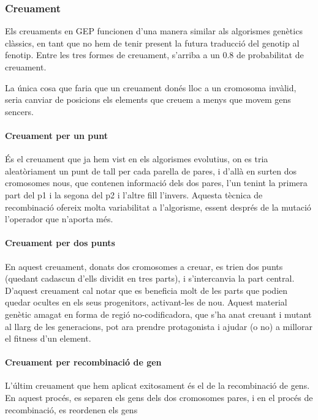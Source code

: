 \subsubsection{Creuament} %
\label{Gssub:Creuament}

Els creuaments en GEP funcionen d'una manera similar als algorismes genètics
clàssics, en tant que no hem de tenir present la futura traducció del genotip al
fenotip.  Entre les tres formes de creuament, s'arriba a un 0.8 de probabilitat
de creuament.

La única cosa que faria que un creuament donés lloc a un cromosoma invàlid,
seria canviar de posicions els elements que creuem a menys que movem gens
sencers.

\paragraph{Creuament per un punt} %
\label{par:Creuament per un punt}
És el creuament que ja hem vist en els algorismes evolutius, on es tria
aleatòriament un punt de tall per cada parella de pares, i d'allà en surten dos
cromosomes nous, que contenen informació dels dos pares, l'un tenint la primera
part del p1 i la segona del p2 i l'altre fill l'invers.  Aquesta tècnica de
recombinació ofereix molta variabilitat a l'algorisme, essent després de la
mutació l'operador que n'aporta més.
\paragraph{Creuament per dos punts} %
\label{par:Creuament per dos punts}
En aquest creuament, donats dos cromosomes a creuar, es trien dos punts (quedant
cadascun d'ells dividit en tres parts), i s'intercanvia la part central.
D'aquest creuament cal notar que es beneficia molt de les parts que podien
quedar ocultes en els seus progenitors, activant-les de nou.  Aquest material
genètic amagat en forma de regió no-codificadora, que s'ha anat creuant i mutant
al llarg de les generacions, pot ara prendre protagonista i ajudar (o no) a
millorar el fitness d'un element.
\paragraph{Creuament per recombinació de gen} %
\label{par:Creuament per recombinacio de gen}

L'últim creuament que hem aplicat exitosament és el de la recombinació de gens.
En aquest procés, es separen els gens dels dos cromosomes pares, i en el procés
de recombinació, es reordenen els gens

